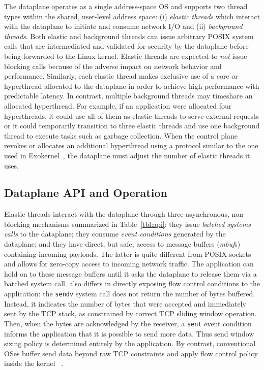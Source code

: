 The \ix dataplane operates as a single address-space OS and supports
two thread types within the shared, user-level address space: (i)
\emph{elastic threads} which interact with the \ix dataplane to
initiate and consume network I/O and (ii) \emph{background threads}.
Both elastic and background threads can issue arbitrary POSIX system
calls that are intermediated and validated for security by the
dataplane before being forwarded to the Linux kernel.  Elastic
threads are expected to \emph{not} issue blocking calls because of the
adverse impact on network behavior and performance. Similarly, each
elastic thread makes exclusive use of a core or hyperthread allocated
to the dataplane in order to achieve high performance with predictable
latency. In contrast, multiple background threads may timeshare an
allocated hyperthread. For example, if an application were
allocated four hyperthreads, it could use all of them as elastic
threads to serve external requests or it could temporarily transition
to three elastic threads and use one background thread to execute
tasks such as garbage collection. When the control plane revokes or
allocates an additional hyperthread using a protocol similar to the
one used in Exokernel~\cite{DBLP:conf/sosp/EnglerKO95}, the dataplane
must adjust the number of elastic threads it uses.


\subsection{Dataplane API and Operation}
\label{sec:impl:kernel}

Elastic threads interact with the \ix dataplane through three
asynchronous, non-blocking mechanisms summarized in
Table~\ref{tbl:api}: they issue \emph{batched systems calls} to the
dataplane; they consume \emph{event conditions} generated by the
dataplane; and they have direct, but safe, access to message buffers
(\emph{mbuf}s) containing incoming payloads.  The latter is quite
different from POSIX sockets and allows for zero-copy access to
incoming network traffic.  The application can hold on to these
message buffers until it asks the dataplane to release them via a
batched system call.  \ix also differs in directly exposing flow
control conditions to the application: the \texttt{sendv} system call
does not return the number of bytes buffered. Instead, it indicates
the number of bytes that were accepted and immediately sent by the TCP
stack, as constrained by correct TCP sliding window operation. Then,
when the bytes are acknowledged by the receiver, a \texttt{sent} event
condition informs the application that it is possible to send more
data. Thus send window sizing policy is determined entirely by the
application.  By contrast, conventional OSes buffer send data beyond
raw TCP constraints and apply flow control policy inside the kernel
~\cite{dynamicwindow}.


